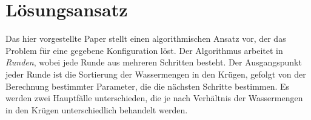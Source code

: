 \chapter{Lösungsansatz} 
Das hier vorgestellte Paper \autocite{Frei.2020} stellt einen algorithmischen Ansatz vor, der das Problem für eine gegebene Konfiguration löst. Der Algorithmus arbeitet in \emph{Runden}, wobei jede Runde aus mehreren Schritten besteht. Der Ausgangspunkt jeder Runde ist die Sortierung der Wassermengen in den Krügen, gefolgt von der Berechnung bestimmter Parameter, die die nächsten Schritte bestimmen. Es werden zwei Hauptfälle unterschieden, die je nach Verhältnis der Wassermengen in den Krügen unterschiedlich behandelt werden.




